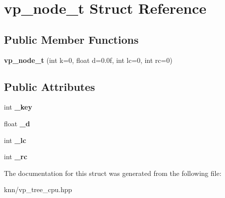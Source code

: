 \hypertarget{structvp__node__t}{}\section{vp\+\_\+node\+\_\+t Struct Reference}
\label{structvp__node__t}
\subsection*{Public Member Functions}
\begin{DoxyCompactItemize}
\item 
\hypertarget{structvp__node__t_a1a146c7ef903ed8237ea9da0aa88916e}{}{\bfseries vp\+\_\+node\+\_\+t} (int k=0, float d=0.\+0f, int lc=0, int rc=0)\label{structvp__node__t_a1a146c7ef903ed8237ea9da0aa88916e}

\end{DoxyCompactItemize}
\subsection*{Public Attributes}
\begin{DoxyCompactItemize}
\item 
\hypertarget{structvp__node__t_a7adf4b160338487408d5ea062cfa2165}{}int {\bfseries \+\_\+key}\label{structvp__node__t_a7adf4b160338487408d5ea062cfa2165}

\item 
\hypertarget{structvp__node__t_a43bc9bf8d77cf7917fa368640a2eef53}{}float {\bfseries \+\_\+d}\label{structvp__node__t_a43bc9bf8d77cf7917fa368640a2eef53}

\item 
\hypertarget{structvp__node__t_a9cdc3c3638a367ee315f12d902443c60}{}int {\bfseries \+\_\+lc}\label{structvp__node__t_a9cdc3c3638a367ee315f12d902443c60}

\item 
\hypertarget{structvp__node__t_ada88f4bdeedf8b895bceb369a3d6e389}{}int {\bfseries \+\_\+rc}\label{structvp__node__t_ada88f4bdeedf8b895bceb369a3d6e389}

\end{DoxyCompactItemize}


The documentation for this struct was generated from the following file\+:\begin{DoxyCompactItemize}
\item 
knn/vp\+\_\+tree\+\_\+cpu.\+hpp\end{DoxyCompactItemize}
